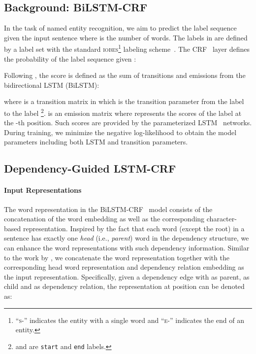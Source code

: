 \documentclass[11pt,a4paper]{article}
\begin{document}
\subsection{Background: BiLSTM-CRF}
In the task of named entity recognition, we aim to predict the label sequence  given the input sentence  where  is the number of words.
The labels in  are defined by a label set with the standard \textsc{iobes}\footnote{``\textsc{s-}'' indicates the entity with a single word and ``\textsc{e-}'' indicates the end of an entity.} labeling scheme~\cite{ramshaw1999text,ratinov2009design}. 
The CRF~\cite{lafferty2001conditional} layer defines the probability of the label sequence  given :



Following \citet{lample2016neural}, the score is defined as the sum of transitions and emissions from the bidirectional LSTM (BiLSTM): 

where  is a transition matrix in which  is the transition parameter from the label  to the label \footnote{ and  are \texttt{start} and \texttt{end} labels.}. 
 is an emission matrix where  represents the scores of the label   at the -th position. 
Such scores are provided by the parameterized LSTM~\cite{hochreiter1997long} networks. 
During training, we minimize the negative log-likelihood to obtain the model parameters including both LSTM and transition parameters. 




\subsection{Dependency-Guided LSTM-CRF}
\paragraph{Input Representations}
The word representation  in the BiLSTM-CRF~\cite{lample2016neural,ma2016end,D17-1035} model consists of the concatenation of the word embedding as well as the corresponding character-based representation. 
Inspired by the fact that each word (except the root) in a sentence has exactly one \textit{head} (i.e., \textit{parent}) word in the dependency structure, we can enhance the word representations with such dependency information. 
Similar to the work by \citet{miwa2016end}, we concatenate the word representation together with the corresponding head word representation and dependency relation embedding as the input representation. 
Specifically, given a dependency edge  with  as parent,  as child and  as dependency relation, the representation at position  can be denoted as:
\end{document}
